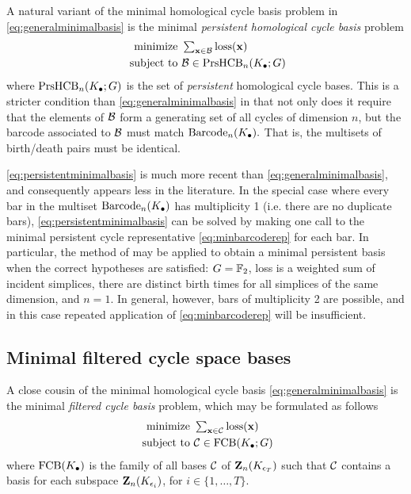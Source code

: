 A natural variant of the minimal homological cycle basis problem in \eq \eqref{eq:generalminimalbasis} is the minimal \emph{persistent homological cycle basis} problem  
\begin{align}
   \begin{split}
    \text{minimize } & \textstyle \sum_{\mathbf{x} \in \mathcal B} \mathrm{loss}(\mathbf{x}) \\
    \text{ subject to } & \mathcal B \in \mathrm{PrsHCB}_n(K_\bullet ; G)
   \end{split}
   \label{eq:persistentminimalbasis}
\end{align}
where $\mathrm{PrsHCB}_n(K_\bullet; G)$ is the set of \emph{persistent} homological cycle bases. This is a stricter condition than \pr \eqref{eq:generalminimalbasis} in that not only does it require that the elements of $\mathcal B$ form a generating set of all cycles of dimension $n$, but the barcode associated to $\mathcal B$ must match $\mathrm{Barcode}_n(K_\bullet).$ That is, the multisets of birth/death pairs must be identical.

\pr \eqref{eq:persistentminimalbasis} is much more recent than \pr \eqref{eq:generalminimalbasis}, and consequently appears less in the literature. In the special case where every bar in the multiset $\mathrm{Barcode}_n(K_\bullet)$ has multiplicity 1 (i.e. there are no duplicate bars), \pr \eqref{eq:persistentminimalbasis} can be solved by making one call to the minimal persistent cycle representative \pr \eqref{eq:minbarcoderep} for each bar.   In particular, the method of \cite{chenquantifying} may be applied to obtain a minimal persistent basis when the correct hypotheses are satisfied: $G = \mathbb{F}_2$, loss is a weighted sum of incident simplices, there are distinct birth times for all simplices of the same dimension, and $n=1$. In general, however, bars of multiplicity 2 are possible, and in this case repeated application of \pr \eqref{eq:minbarcoderep} will be insufficient.  

\subsection{Minimal filtered cycle space bases}

A close cousin of the minimal homological cycle basis \pr \eqref{eq:generalminimalbasis} is the minimal \emph{filtered cycle basis} problem, which may be formulated as  follows
\begin{align}
   \begin{split}
    \text{minimize } & \textstyle \sum_{\mathbf{x} \in \mathcal{C}} \mathrm{loss}(\mathbf{x}) \\
    \text{ subject to } & \mathcal{C} \in \mathrm{FCB}(K_\bullet ; G)
   \end{split}
   \label{eq:filteredminimalbasis}
\end{align}
where $\mathrm{FCB}(K_\bullet)$ is the family of all bases $\mathcal{C}$ of $\mathbf{Z}_n(K_{\epsilon_T})$ such that $\mathcal{C}$ contains a basis for each  subspace $\mathbf{Z}_n(K_{\epsilon_i})$, for $i \in \{1, \ldots, T\}$.  

